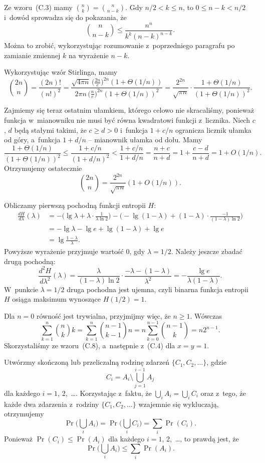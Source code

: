 Ze wzoru~(C.3) mamy $\binom{n}{k}=\binom{n}{n-k}$. Gdy $n/2<k\le n$, to $0\le n-k<n/2$ i~dowód sprowadza się do pokazania, że
\[
	\binom{n}{n-k} \le \frac{n^n}{k^k(n-k)^{n-k}}.
\]
Można to zrobić, wykorzystując rozumowanie z~poprzedniego paragrafu po zamianie zmiennej $k$ na wyrażenie $n-k$.

\exercise %
Wykorzystując wzór Stirlinga, mamy
\[
	\binom{2n}{n} = \frac{(2n)!}{(n!)^2} = \frac{\sqrt{4\pi n}\,\bigl(\frac{2n}{e}\bigr)^{2n}(1+\Theta(1/n))}{2\pi n\,\bigl(\frac{n}{e}\bigr)^{2n}(1+\Theta(1/n))^2} = \frac{2^{2n}}{\sqrt{\pi n}}\cdot\frac{1+\Theta(1/n)}{(1+\Theta(1/n))^2}.
\]

Zajmiemy się teraz ostatnim ułamkiem, którego celowo nie skracaliśmy, ponieważ funkcja w~mianowniku nie musi być równa kwadratowi funkcji z~licznika. Niech $c$, $d$ będą stałymi takimi, że $c\ge d>0$ i~funkcja $1+c/n$ ogranicza licznik ułamka od góry, a~funkcja $1+d/n$ -- mianownik ułamka od dołu. Mamy
\[
    \frac{1+\Theta(1/n)}{(1+\Theta(1/n))^2} \le \frac{1+c/n}{(1+d/n)^2} < \frac{1+c/n}{1+d/n} = \frac{n+c}{n+d} = 1+\frac{c-d}{n+d} = 1+O(1/n).
\]
Otrzymujemy ostatecznie
\[
    \binom{2n}{n} = \frac{2^{2n}}{\sqrt{\pi n}}(1+O(1/n)).
\]

\exercise %
Obliczamy pierwszą pochodną funkcji entropii $H$:
\begin{align*}
    \frac{dH}{d\lambda}(\lambda) &= -\biggl(\lg\lambda+\lambda\cdot\frac{1}{\lambda\ln2}\biggr)-\biggl(-\lg(1-\lambda)+(1-\lambda)\cdot\frac{-1}{(1-\lambda)\ln2}\biggr) \\[1mm]
	&= -\lg\lambda-\lg e+\lg(1-\lambda)+\lg e \\[1mm]
	&= \lg\frac{1-\lambda}{\lambda}.
\end{align*}
Powyższe wyrażenie przyjmuje wartość 0, gdy $\lambda=1/2$. Należy jeszcze zbadać drugą pochodną:
\[
	\frac{d^2\!H}{d\lambda^2}(\lambda) = \frac{\lambda}{(1-\lambda)\ln2}\cdot\frac{-\lambda-(1-\lambda)}{\lambda^2} = -\frac{\lg e}{\lambda(1-\lambda)}.
\]
W~punkcie $\lambda=1/2$ druga pochodna jest ujemna, czyli binarna funkcja entropii $H$ osiąga maksimum wynoszące $H(1/2)=1$.

\exercise %
Dla $n=0$ równość jest trywialna, przyjmijmy więc, że $n\ge1$. Wówczas
\[
	\sum_{k=1}^n\binom{n}{k}k = \sum_{k=1}^n\binom{n-1}{k-1}n = n\sum_{k=0}^{n-1}\binom{n-1}{k} = n2^{n-1}.
\]
Skorzystaliśmy ze wzoru~(C.8), a~następnie z~(C.4) dla $x=y=1$.


\exercise %
Utwórzmy skończoną lub przeliczalną rodzinę zdarzeń $\{C_1,C_2,\dots\}$, gdzie
\[
	C_i = A_i\setminus\bigcup_{j=1}^{i-1}A_j
\]
dla każdego $i=1$, 2,~\dots. Korzystając z~faktu, że $\bigcup_iA_i = \bigcup_iC_i$ oraz z~tego, że każde dwa zdarzenia z~rodziny $\{C_1,C_2,\dots\}$ wzajemnie się wykluczają, otrzymujemy
\[
	\Pr\biggl(\bigcup_iA_i\biggr) = \Pr\biggl(\bigcup_iC_i\biggr) = \sum_i\Pr(C_i).
\]
Ponieważ $\Pr(C_i)\le\Pr(A_i)$ dla każdego $i=1$, 2,~\dots, to prawdą jest, że
\[
	\Pr\biggl(\bigcup_iA_i\biggr) \le \sum_i\Pr(A_i).
\]

